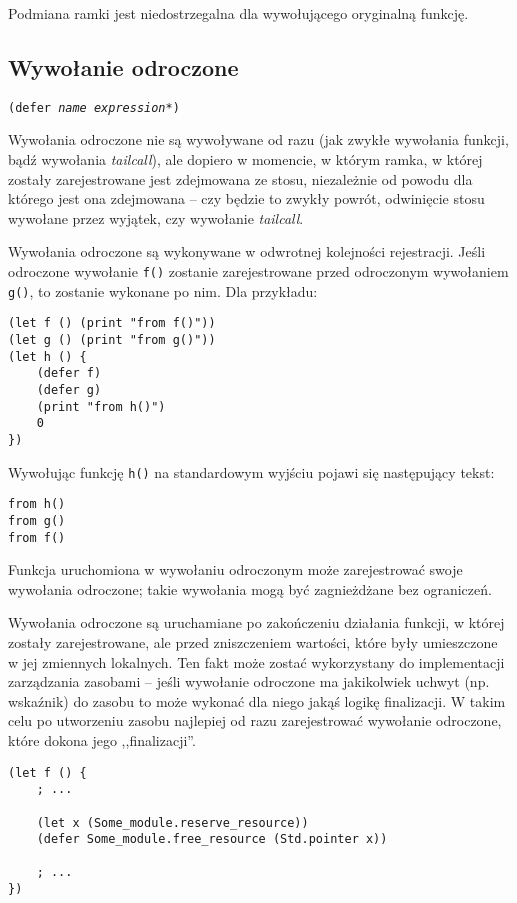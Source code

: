 Podmiana ramki jest niedostrzegalna dla wywołującego oryginalną funkcję.

\subsection{Wywołanie odroczone}
\label{viuact_spec_deferred_call}

\texttt{(defer \emph{name} \emph{expression}*)}
\newline

Wywołania odroczone nie są wywoływane od razu (jak zwykłe wywołania funkcji, bądź wywołania \emph{tailcall}),
ale dopiero w momencie, w którym ramka, w której zostały zarejestrowane jest zdejmowana ze stosu, niezależnie
od powodu dla którego jest ona zdejmowana -- czy będzie to zwykły powrót, odwinięcie stosu wywołane przez
wyjątek, czy wywołanie \emph{tailcall}.

Wywołania odroczone są wykonywane w odwrotnej kolejności rejestracji. Jeśli odroczone wywołanie \texttt{f()}
zostanie zarejestrowane przed odroczonym wywołaniem \texttt{g()}, to zostanie wykonane po nim. Dla przykładu:

\begin{lstlisting}
(let f () (print "from f()"))
(let g () (print "from g()"))
(let h () {
    (defer f)
    (defer g)
    (print "from h()")
    0
})
\end{lstlisting}

Wywołując funkcję \texttt{h()} na standardowym wyjściu pojawi się następujący tekst:

\begin{verbatim}
from h()
from g()
from f()
\end{verbatim}

Funkcja uruchomiona w wywołaniu odroczonym może zarejestrować swoje wywołania odroczone; takie wywołania
mogą być zagnieżdżane bez ograniczeń.

Wywołania odroczone są uruchamiane po zakończeniu działania funkcji, w której zostały zarejestrowane, ale
przed zniszczeniem wartości, które były umieszczone w jej zmiennych lokalnych. Ten fakt może zostać
wykorzystany do implementacji zarządzania zasobami -- jeśli wywołanie odroczone ma jakikolwiek uchwyt (np.
wskaźnik) do zasobu to może wykonać dla niego jakąś logikę finalizacji. W takim celu po utworzeniu zasobu
najlepiej od razu zarejestrować wywołanie odroczone, które dokona jego ,,finalizacji''.

\begin{lstlisting}
(let f () {
    ; ...

    (let x (Some_module.reserve_resource))
    (defer Some_module.free_resource (Std.pointer x))

    ; ...
})
\end{lstlisting}

